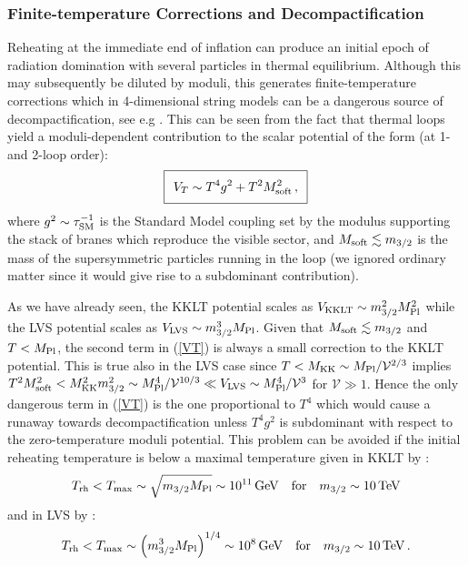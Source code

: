\subsubsection{Finite-temperature Corrections and Decompactification}

Reheating at the immediate end of inflation can produce an initial epoch of radiation domination with several particles in thermal equilibrium. 
Although this may subsequently be diluted by moduli,
this generates finite-temperature corrections which in 4-dimensional string models can be a dangerous source of decompactification, see e.g \cite{Buchmuller:2004xr, Buchmuller:2004tz, Danos:2008pv, Anguelova:2009ht, DiMarco:2019czi, Gallego:2020vbe,Alam:2022rtt}. This can be seen from the fact that thermal loops yield a moduli-dependent contribution to the scalar potential of the form (at 1- and 2-loop order):
\begin{equation}
\setlength\fboxsep{0.25cm}
\setlength\fboxrule{0.4pt}
\boxed{
V_T \sim T^4 g^2 + T^2 M_{\rm soft}^2\,,
\label{VT}
}
\end{equation}
where $g^2\sim \tau_{\rm SM}^{-1}$ is the Standard Model coupling set by the modulus supporting the stack of branes which reproduce the visible sector, and $M_{\rm soft}\lesssim m_{3/2}$ is the mass of the supersymmetric particles running in the loop (we ignored ordinary matter since it would give rise to a subdominant contribution). 

As we have already seen, the KKLT potential scales as $V_{\rm KKLT}\sim m_{3/2}^2 M_{\rm Pl}^2$ while the LVS potential scales as $V_{\rm LVS}\sim m_{3/2}^3 M_{\rm Pl}$. Given that $M_{\rm soft}\lesssim m_{3/2}$ and $T< M_{\rm Pl}$, the second term in (\ref{VT}) is always a small correction to the KKLT potential. This is true also in the LVS case since $T < M_{\rm KK} \sim M_{\rm Pl}/\mathcal{V}^{2/3}$ implies $T^2 M_{\rm soft}^2 < M_{\rm KK}^2 m_{3/2}^2 \sim M_{\rm Pl}^4/\mathcal{V}^{10/3} \ll V_{\rm LVS} \sim M_{\rm Pl}^4/\mathcal{V}^3$ for $\mathcal{V}\gg 1$. Hence the only dangerous term in (\ref{VT}) is the one proportional to $T^4$ which would cause a runaway towards decompactification unless $T^4 g^2$ is subdominant with respect to the zero-temperature moduli potential. This problem can be avoided if 
the initial reheating temperature is below a maximal temperature given in KKLT by \cite{Buchmuller:2004tz}: 
\begin{equation}
T_{\rm rh}<T_{\rm max}\sim \sqrt{m_{3/2} M_{\rm Pl}}\sim 10^{11}\,{\rm GeV}\quad\text{for}\quad m_{3/2}\sim 10\,{\rm TeV}
\end{equation}
and in LVS by \cite{Anguelova:2009ht}:
\begin{equation}
T_{\rm rh}<T_{\rm max}\sim \left(m_{3/2}^3 M_{\rm Pl}\right)^{1/4}\sim 10^8\,{\rm GeV}\quad\text{for}\quad m_{3/2}\sim 10\,{\rm TeV}\,.
\end{equation}

